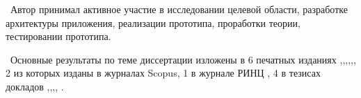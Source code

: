\contribution\ Автор принимал активное участие в исследовании целевой области, разработке архитектуры приложения, реализации прототипа, проработки теории, тестировании прототипа.

\publications\ Основные результаты по теме диссертации изложены в 6 печатных изданиях  \cite{Lobachevskii},\cite{WCIT-2012},\cite{RCDL-2014},\cite{AINL-2013},\cite{ISGZ},\cite{AMSTA-2015}, 
2 из которых изданы в журналах Scopus, 1 в журнале РИНЦ  \cite{ISGZ}, 
4 в тезисах докладов \cite{Lobachevskii},\cite{WCIT-2012},\cite{AINL-2013},\cite{ISGZ}, \cite{IJSE-1}.



